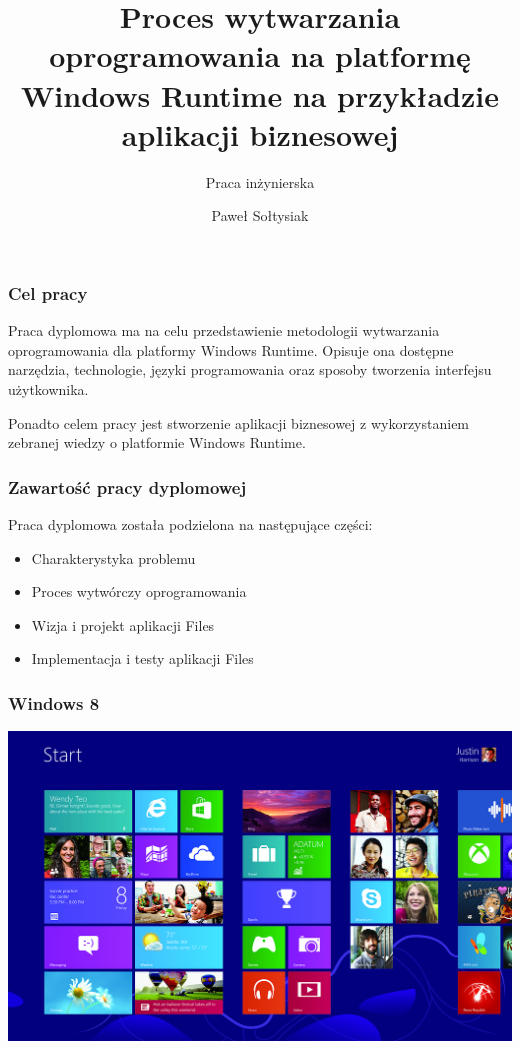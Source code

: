\documentclass{beamer}
\title{Proces wytwarzania oprogramowania na platformę Windows Runtime na przykładzie aplikacji biznesowej}
\subtitle{Praca inżynierska}
\author{Paweł Sołtysiak}
\institute{Wydział Informatyki Zachodniopomorskiego Uniwersytetu Technologicznego}
\date{ }
\begin{document}
\begin{frame}
\titlepage
\end{frame} 


\begin{frame}
\frametitle{Cel pracy} 
Praca dyplomowa ma na celu przedstawienie metodologii wytwarzania oprogramowania dla platformy Windows Runtime. Opisuje ona dostępne narzędzia, technologie, języki programowania oraz sposoby tworzenia interfejsu użytkownika.

Ponadto celem pracy jest stworzenie aplikacji biznesowej z wykorzystaniem zebranej wiedzy o platformie Windows Runtime.
\end{frame}


\begin{frame}
\frametitle{Zawartość pracy dyplomowej}
Praca dyplomowa została podzielona na następujące części:
\begin{itemize}[<+->]
\item Charakterystyka problemu
\item Proces wytwórczy oprogramowania
\item Wizja i projekt aplikacji Files
\item Implementacja i testy aplikacji Files
\end{itemize}
\end{frame}

\begin{frame}
\frametitle{Windows 8}
 \includegraphics[width=\textwidth]{images/windows-8.jpg}
\end{frame}
\end{document}
